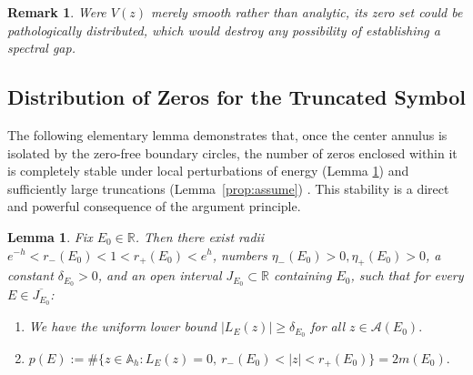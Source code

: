 \documentclass[reqno,11pt]{amsart}
\newtheorem{lemma}{Lemma}[section]
\newtheorem{remark}{Remark}[section]
\begin{document}
\begin{remark}
Were $V(z)$ merely smooth rather than analytic, its zero set could be pathologically distributed, which would destroy any possibility of establishing a spectral gap. 
\end{remark}

\subsection{Distribution of Zeros for the Truncated Symbol}\label{sec:4.2}
The following elementary lemma demonstrates that, once the center annulus is isolated by the zero-free boundary circles, the number of zeros enclosed within it is completely stable under local perturbations of energy (Lemma \ref{lem:locals}) and   sufficiently large truncations (Lemma~\ref{prop:assume}) . This stability is a direct and powerful consequence of the argument principle.

\begin{lemma}\label{lem:locals}
Fix $E_0\in\mathbb R$. Then there exist radii $e^{-h} < r_-(E_0) < 1 < r_+(E_0) < e^h$, numbers $\eta_-(E_0)>0, \eta_+(E_0)>0$, a constant $\delta_{E_0}>0$, and an open interval $J_{E_0}\subset\mathbb R$ containing $E_0$, such that for every $E\in \overline{J_{E_0}}$:
\begin{enumerate}
    \item We have the uniform lower bound 
    $
    |L_{E}^{}(z)|\ge \delta_{E_0}
    $
    for all $z \in \mathcal{A}(E_0).$ 
    \item  $p(E):=\#\{z\in\mathbb A_h: L_{E}^{}(z)=0,\ r_-(E_0) < |z| < r_+(E_0)\} = 2m(E_0).
$\end{enumerate}
\end{lemma}
\end{document}
